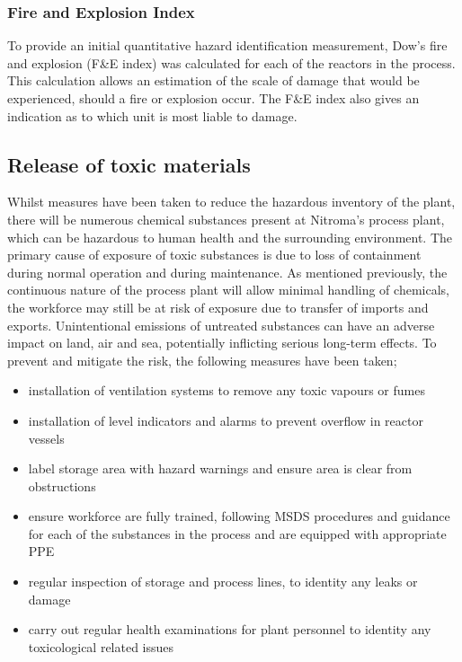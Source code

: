 \subsubsection{Fire and Explosion Index}

To provide an initial quantitative hazard identification measurement, Dow's fire and explosion (F\&E index) was calculated for each of the reactors in the process. This calculation allows an estimation of the scale of damage that would be experienced, should a fire or explosion occur. The F\&E index also gives an indication as to which unit is most liable to damage. 


\subsection{Release of toxic materials}

Whilst measures have been taken to reduce the hazardous inventory of the plant, there will be numerous chemical substances present at Nitroma's process plant, which can be hazardous to human health and the surrounding environment. The primary cause of exposure of toxic substances is due to loss of containment during normal operation and during maintenance. As mentioned previously, the continuous nature of the process plant will allow minimal handling of chemicals, the workforce may still be at risk of exposure due to transfer of imports and exports. Unintentional emissions of untreated substances can have an adverse impact on land, air and sea, potentially inflicting serious long-term effects. To prevent and mitigate the risk, the following measures have been taken;

\begin{itemize}
    \item installation of ventilation systems to remove any toxic vapours or fumes 
    \item installation of level indicators and alarms to prevent overflow in reactor vessels 
    \item label storage area with hazard warnings and ensure area is clear from obstructions
    \item ensure workforce are fully trained, following MSDS procedures and guidance for each of the substances in the process and are equipped with appropriate PPE 
    \item regular inspection of storage and process lines, to identity any leaks or damage
    \item carry out regular health examinations for plant personnel to identity any toxicological related issues
\end{itemize}

